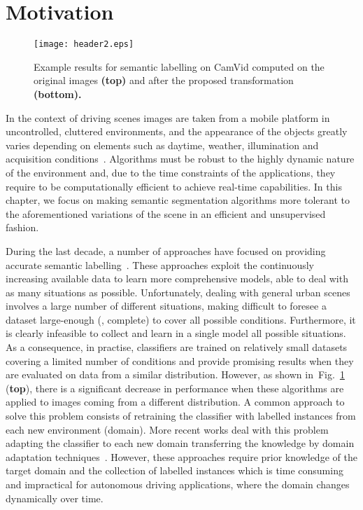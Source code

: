 \section{Motivation}

\begin{figure}[!b]
    \centering
    \vspace{4mm}
    \texttt{[image: header2.eps]}
    \caption[Example of Reinhard vs our approach in terms of artefacts.]{Example results for semantic labelling on CamVid computed on the original images \textbf{(top)} and after the proposed transformation \textbf{(bottom).}}
    \label{41:fig:header1}
\end{figure}

In the context of driving scenes images are
taken from a mobile platform in uncontrolled, cluttered
environments, and the appearance of the objects greatly varies
depending on elements such as daytime, weather, illumination and
acquisition conditions~\cite{DaimlerECCV:2014}. Algorithms must be robust to the highly
dynamic nature of the environment and, due to the time constraints
of the applications, they require to be computationally efficient
to achieve real-time capabilities. In this chapter, we focus on making semantic segmentation algorithms more tolerant to the aforementioned variations of
the scene in an efficient and unsupervised fashion.

During the last decade, a number of approaches have focused on
providing accurate semantic labelling~\cite{Ladicky:2013,HoiemIJCV:2007,Make3dCVPR:2014,ZhangECCV:2010}.
These approaches exploit the continuously increasing available
data to learn more comprehensive models, able to deal with as many
situations as possible. Unfortunately, dealing with general urban
scenes involves a large number of different situations, making
difficult to foresee a dataset large-enough (\ie, complete) to
cover all possible conditions. Furthermore, it is clearly
infeasible to collect and learn in a single model all possible
situations. As a consequence, in practise, classifiers are trained
on relatively small datasets covering a limited number of
conditions and provide promising results when they are evaluated
on data from a similar distribution. However, as shown
in~Fig.~\ref{41:fig:header1} (\textbf{top}), there is a significant decrease in
performance when these algorithms are applied to images coming
from a different distribution. A common approach to solve this
problem consists of retraining the classifier with labelled
instances from each new environment (domain). More recent works
deal with this problem adapting the classifier to each new domain
transferring the knowledge by domain adaptation
techniques~\cite{XRV2013, Vazquez:2013b,LixinPAMI2012}. However,
these approaches require prior knowledge of the target domain and
the collection of labelled instances which is time consuming and
impractical for autonomous driving applications, where the domain
changes dynamically over time.


